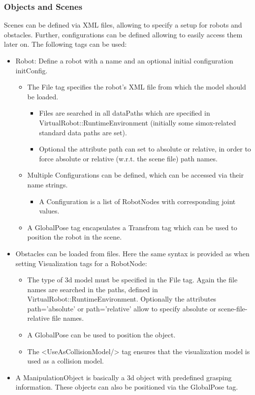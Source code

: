 \subsubsection*{Objects and Scenes}
\par
Scenes can be defined via XML files, allowing to specify a setup for robots and obstacles. Further, configurations can be defined allowing to easily access them later on. The following tags can be used: 
\begin{itemize}
  \item Robot: Define a robot with a name and an optional initial configuration initConfig. 

  \begin{itemize}
    \item The File tag specifies the robot's XML file from which the model should be loaded. 
    \begin{itemize}
    \item Files are searched in all dataPaths which are specified in VirtualRobot::RuntimeEnvironment (initially some simox-related standard data paths are set). 
    \item Optional the attribute path can set to absolute or relative, in order to force absolute or relative (w.r.t. the scene file) path names. 
    \end{itemize}
    \item Multiple Configurations can be defined, which can be accessed via their name strings. 
    \begin{itemize}
    \item A Configuration is a list of RobotNodes with corresponding joint values. 
    \end{itemize}
    \item A GlobalPose tag encapsulates a Transfrom tag which can be used to position the robot in the scene. 
  \end{itemize}

  \item Obstacles can be loaded from files. Here the same syntax is provided as when setting Visualization tags for a RobotNode: 
  \begin{itemize}
       \item The type of 3d model must be specified in the File tag. Again the file names are searched in the paths, defined in VirtualRobot::RuntimeEnvironment. Optionally the attributes path='absolute' or path='relative' allow to specify absolute or scene-file-relative file names.
      \item A GlobalPose can be used to position the object.
      \item The <UseAsCollisionModel/> tag ensures that the visualization model is used as a collision model.
  \end{itemize}
\item A ManipulationObject is basically a 3d object with predefined grasping information. These objects can also be positioned via the GlobalPose tag. 
\end{itemize}
